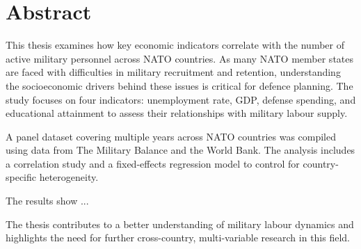 \chapter{Abstract}

This thesis examines how key economic indicators correlate with the number of active 
military personnel across NATO countries. As many NATO member states are faced 
with difficulties in military recruitment and retention, understanding the socioeconomic 
drivers behind these issues is critical for defence planning. 
The study focuses on four indicators: unemployment rate, GDP, defense spending, 
and educational attainment to assess their relationships with military labour supply.

A panel dataset covering multiple years across NATO countries was compiled using 
data from The Military Balance and the World Bank. 
The analysis includes a correlation study and a 
fixed-effects regression model to control for country-specific heterogeneity.

The results show ...

The thesis contributes to a better understanding of military labour dynamics 
and highlights the need for further cross-country, 
multi-variable research in this field.